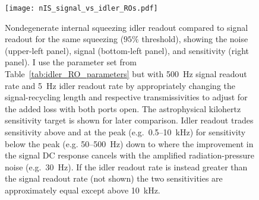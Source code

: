 \begin{figure}[t]
    \centering
    \texttt{[image: nIS\_signal\_vs\_idler\_ROs.pdf]}
    \caption{ Nondegenerate internal squeezing idler readout compared to signal readout for the same squeezing ($95\%$ threshold), showing the noise (upper-left panel), signal (bottom-left panel), and sensitivity (right panel). I use the parameter set from Table~\ref{tab:idler_RO_parameters} but with 500~Hz signal readout rate and 5~Hz idler readout rate by appropriately changing the signal-recycling length and respective transmissivities to adjust for the added loss with both ports open. The astrophysical kilohertz sensitivity target is shown for later comparison. Idler readout trades sensitivity above and at the peak (e.g.\ 0.5--10~kHz) for sensitivity below the peak (e.g. 50--500~Hz) down to where the improvement in the signal DC response cancels with the amplified radiation-pressure noise (e.g.\ 30~Hz). If the idler readout rate is instead greater than the signal readout rate (not shown) the two sensitivities are approximately equal except above 10~kHz. %
    }
    \label{fig:nIS_signal_vs_idler_ROs}
\end{figure}

